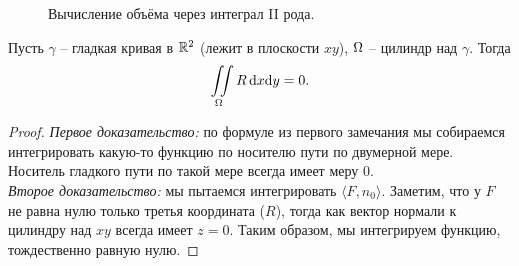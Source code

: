 \begin{figure}[h!]
    \centering
    \caption{Вычисление объёма через интеграл II рода.}
\end{figure}

\begin{remark}
    Пусть $\gamma$ -- гладкая кривая в $\mathbb{R}^2$ (лежит в плоскости $xy$), $\Omega$ -- цилиндр над $\gamma$. Тогда
\[
    \iint\limits_{\Omega}{R \,\mathrm{d} x \mathrm{d} y} = 0
.\] 
\end{remark}
\begin{proof}
    \textit{Первое доказательство:} по формуле из первого замечания мы собираемся интегрировать
    какую-то функцию по носителю пути по двумерной мере. Носитель гладкого пути по такой мере
    всегда имеет меру 0. \\
    \textit{Второе доказательство:} мы пытаемся интегрировать $\langle F, n_0 \rangle$.
    Заметим, что у $F$ не равна нулю только третья координата ($R$), тогда как
    вектор нормали к цилиндру над $xy$ всегда имеет $z = 0$. Таким
    образом, мы интегрируем функцию, тождественно равную нулю.
\end{proof}

